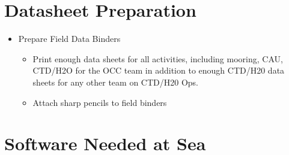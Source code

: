 \documentclass[]{book}
\providecommand{\tightlist}{%
  \setlength{\itemsep}{0pt}\setlength{\parskip}{0pt}}
\begin{document}
\hypertarget{datasheet-preparation}{%
\section{Datasheet Preparation}\label{datasheet-preparation}}

\begin{itemize}
\tightlist
\item
  Prepare Field Data Binders

  \begin{itemize}
  \tightlist
  \item
    Print enough data sheets for all activities, including mooring, CAU, CTD/H2O for the OCC team in addition to enough CTD/H20 data sheets for any other team on CTD/H20 Ops.
  \item
    Attach sharp pencils to field binders
  \end{itemize}
\end{itemize}

\hypertarget{software-needed-at-sea}{%
\section{Software Needed at Sea}\label{software-needed-at-sea}}
\end{document}
